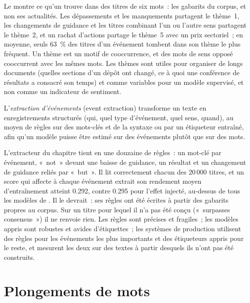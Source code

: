 Le  montre ce qu'un  trouve dans des titres de six mots~: les gabarits du corpus, et non ses actualités.
Les dépassements et les manquements partagent le thème~1, les changements de guidance et les titres combinant l'un ou l'autre sens partagent le thème~2, et un rachat d'actions partage
le thème~5 avec un prix sectoriel~; en
moyenne, seuls 63~\% des titres d'un événement tombent dans son thème le plus fréquent. Un thème est un motif de cooccurrence, et des mots
de sens opposé cooccurrent avec les mêmes mots. Les thèmes sont utiles pour organiser de longs documents (quelles sections
d'un dépôt ont changé, ce à quoi une conférence de résultats a consacré son temps) et comme variables pour un modèle supervisé, et non comme un indicateur de sentiment.

\begin{definition}\label{def:ml:text-from-bag-of-words-to-embeddings:events}
L'\emph{extraction d'événements} (event extraction) transforme un texte en enregistrements structurés (qui, quel type d'événement, quel
sens, quand), au moyen de règles sur des mots-clés et de la syntaxe ou par un étiqueteur entraîné, afin qu'un modèle puisse être estimé sur des événements plutôt
que sur des mots.
\end{definition}

L'extracteur du chapitre tient en une douzaine de règles~: un mot-clé par événement, «~not~» devant une baisse de guidance, un résultat et un
changement de guidance reliés par «~but~». Il lit correctement chacun des 20\,000 titres, et un score qui affecte à chaque
événement extrait son rendement moyen d'entraînement atteint 0.292, contre 0.295 pour l'effet injecté, au-dessus de tous les modèles de .
Il le devrait~: ses règles ont été écrites à partir des gabarits propres au corpus. Sur un titre pour lequel il n'a pas été conçu («~surpasses
consensus~») il ne renvoie rien. Les règles sont précises et fragiles~; les modèles appris sont robustes et avides d'étiquettes~; les systèmes de production
utilisent des règles pour les événements les plus importants et des étiqueteurs appris pour le reste, et mesurent les deux sur des textes
à partir desquels ils n'ont pas été construits.

\section{Plongements de mots}

